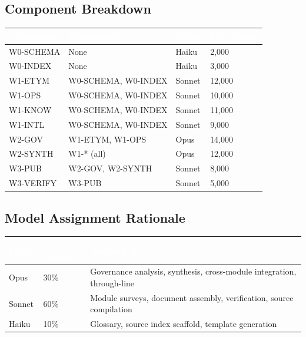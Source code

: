 \documentclass[11pt,letterpaper]{article}
\newcommand{\tableheader}[1]{\textbf{\sffamily\textcolor{white}{#1}}}
\begin{document}
\subsection{Component Breakdown}

\begin{center}
\begin{tabularx}{\textwidth}{L{2.5cm}L{2.5cm}C{1.5cm}C{2cm}}
\toprule
{}
\tableheader{Component} & \tableheader{Dependencies} & \tableheader{Model} & \tableheader{Est. Tokens} \\
\midrule
W0-SCHEMA & None & Haiku & 2,000 \\
W0-INDEX & None & Haiku & 3,000 \\
W1-ETYM & W0-SCHEMA, W0-INDEX & Sonnet & 12,000 \\
W1-OPS & W0-SCHEMA, W0-INDEX & Sonnet & 10,000 \\
W1-KNOW & W0-SCHEMA, W0-INDEX & Sonnet & 11,000 \\
W1-INTL & W0-SCHEMA, W0-INDEX & Sonnet & 9,000 \\
W2-GOV & W1-ETYM, W1-OPS & Opus & 14,000 \\
W2-SYNTH & W1-* (all) & Opus & 12,000 \\
W3-PUB & W2-GOV, W2-SYNTH & Sonnet & 8,000 \\
W3-VERIFY & W3-PUB & Sonnet & 5,000 \\
\bottomrule
\end{tabularx}
\end{center}

\subsection{Model Assignment Rationale}

\begin{center}
\begin{tabularx}{\textwidth}{C{1.5cm}C{1.5cm}X}
\toprule
{}
\tableheader{Model} & \tableheader{\% Budget} & \tableheader{Assigned To} \\
\midrule
Opus & 30\% & Governance analysis, synthesis, cross-module integration, through-line \\
Sonnet & 60\% & Module surveys, document assembly, verification, source compilation \\
Haiku & 10\% & Glossary, source index scaffold, template generation \\
\bottomrule
\end{tabularx}
\end{center}
\end{document}

